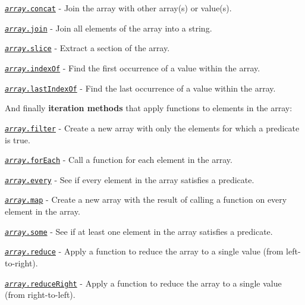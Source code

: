 \begin{DoxyItemize}
\item \href{https://developer.mozilla.org/en-US/docs/Web/JavaScript/Reference/Global_Objects/Array/concat}{\tt {\itshape array}.concat} -\/ Join the array with other array(s) or value(s).
\item \href{https://developer.mozilla.org/en-US/docs/Web/JavaScript/Reference/Global_Objects/Array/join}{\tt {\itshape array}.join} -\/ Join all elements of the array into a string.
\item \href{https://developer.mozilla.org/en-US/docs/Web/JavaScript/Reference/Global_Objects/Array/slice}{\tt {\itshape array}.slice} -\/ Extract a section of the array.
\item \href{https://developer.mozilla.org/en-US/docs/Web/JavaScript/Reference/Global_Objects/Array/indexOf}{\tt {\itshape array}.index\+Of} -\/ Find the first occurrence of a value within the array.
\item \href{https://developer.mozilla.org/en-US/docs/Web/JavaScript/Reference/Global_Objects/Array/lastIndexOf}{\tt {\itshape array}.last\+Index\+Of} -\/ Find the last occurrence of a value within the array.
\end{DoxyItemize}

And finally {\bfseries iteration methods} that apply functions to elements in the array\+:


\begin{DoxyItemize}
\item \href{https://developer.mozilla.org/en-US/docs/Web/JavaScript/Reference/Global_Objects/Array/filter}{\tt {\itshape array}.filter} -\/ Create a new array with only the elements for which a predicate is true.
\item \href{https://developer.mozilla.org/en-US/docs/Web/JavaScript/Reference/Global_Objects/Array/forEach}{\tt {\itshape array}.for\+Each} -\/ Call a function for each element in the array.
\item \href{https://developer.mozilla.org/en-US/docs/Web/JavaScript/Reference/Global_Objects/Array/every}{\tt {\itshape array}.every} -\/ See if every element in the array satisfies a predicate.
\item \href{https://developer.mozilla.org/en-US/docs/Web/JavaScript/Reference/Global_Objects/Array/map}{\tt {\itshape array}.map} -\/ Create a new array with the result of calling a function on every element in the array.
\item \href{https://developer.mozilla.org/en-US/docs/Web/JavaScript/Reference/Global_Objects/Array/some}{\tt {\itshape array}.some} -\/ See if at least one element in the array satisfies a predicate.
\item \href{https://developer.mozilla.org/en-US/docs/Web/JavaScript/Reference/Global_Objects/Array/reduce}{\tt {\itshape array}.reduce} -\/ Apply a function to reduce the array to a single value (from left-\/to-\/right).
\item \href{https://developer.mozilla.org/en-US/docs/Web/JavaScript/Reference/Global_Objects/Array/reduceRight}{\tt {\itshape array}.reduce\+Right} -\/ Apply a function to reduce the array to a single value (from right-\/to-\/left).
\end{DoxyItemize}

